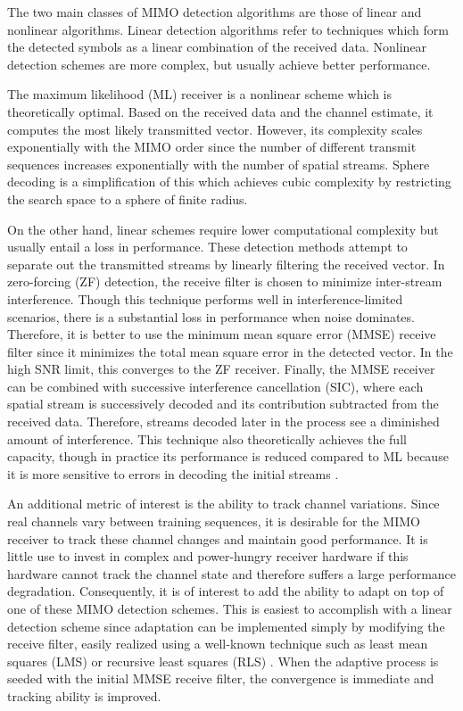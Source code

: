 \documentclass[journal]{IEEEtran}
\begin{document}
The two main classes of MIMO detection algorithms are those of linear and nonlinear algorithms. Linear detection algorithms refer to techniques which form the detected symbols as a linear combination of the received data. Nonlinear detection schemes are more complex, but usually achieve better performance. 

The maximum likelihood (ML) receiver is a nonlinear scheme which is theoretically optimal. Based on the received data and the channel estimate, it computes  the most likely transmitted vector. However, its complexity scales exponentially with the MIMO order since the number of different transmit sequences increases exponentially with the number of spatial streams. Sphere decoding is a simplification of this which achieves cubic complexity by restricting the search space to a sphere of finite radius. 

On the other hand, linear schemes require lower computational complexity but usually entail a loss in performance. These detection methods attempt to separate out the transmitted streams by linearly filtering the received vector. In zero-forcing (ZF) detection, the receive filter is chosen to minimize inter-stream interference. Though this technique performs well in interference-limited scenarios, there is a substantial loss in performance when noise dominates. Therefore, it is better to use the minimum mean square error (MMSE) receive filter since it minimizes the total mean square error in the detected vector. In the high SNR limit, this converges to the ZF receiver. Finally, the MMSE receiver can be combined with successive interference cancellation (SIC), where each spatial stream is successively decoded and its contribution subtracted from the received data. Therefore, streams decoded later in the process see a diminished amount of interference. This technique also theoretically achieves the full capacity, though in practice its performance is reduced compared to ML because it is more sensitive to errors in decoding the initial streams \cite{tse}. 

An additional metric of interest is the ability to track channel variations. Since real channels vary between training sequences, it is desirable for the MIMO receiver to track these channel changes and maintain good performance. It is little use to invest in complex and power-hungry receiver hardware if this hardware cannot track the channel state and therefore suffers a large performance degradation. Consequently, it is of interest to add the ability to adapt on top of one of these MIMO detection schemes. This is easiest to accomplish with a linear detection scheme since adaptation can be implemented simply by modifying the receive filter, easily realized using a well-known technique such as least mean squares (LMS) or recursive least squares (RLS) \cite{digital_bf, bf_notes}. When the adaptive process is seeded with the initial MMSE receive filter, the convergence is immediate and tracking ability is improved.
\end{document}
